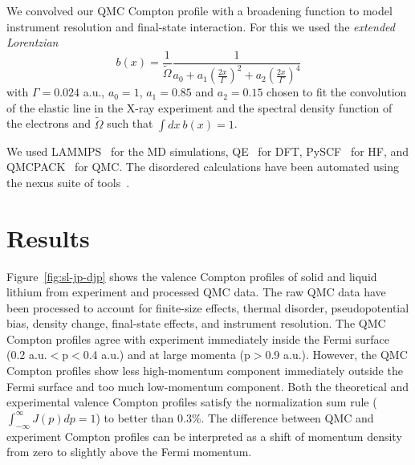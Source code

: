 \documentclass[aps,prb,showpacs,preprintnumbers,amsmath,amssymb,superscriptaddress,twocolumn]{revtex4-1}
\begin{document}
We convolved our QMC Compton profile with a broadening function to model instrument resolution and final-state interaction. For this we used the \emph{extended Lorentzian}
\begin{equation}
b(x) = \frac{1}{\tilde{\Omega}} \frac{1}{
a_0+a_1(\frac{2x}{\Gamma})^2+a_2(\frac{2x}{\Gamma})^4
}\label{eq:elorentz}
\end{equation}
with $\Gamma=0.024$ a.u., $a_0=1$, $a_1=0.85$ and $a_2=0.15$ chosen to fit the convolution of the elastic line in the X-ray experiment and the spectral density function of the electrons and $\tilde{\Omega}$ such that $\int dx ~b(x)=1$. 

We used LAMMPS~\cite{Plimpton1995} for the MD simulations, QE~\cite{Giannozzi2009,Giannozzi2017} for DFT, PySCF~\cite{PYSCF} for HF, and QMCPACK~\cite{Kim2018} for QMC. The disordered calculations have been automated using the nexus suite of tools~\cite{Krogel2016}.

\section{Results} \label{sec:results}

Figure~\ref{fig:sl-jp-djp} shows the valence Compton profiles of solid and liquid lithium from experiment and processed QMC data. The raw QMC data have been processed to account for finite-size effects, thermal disorder, pseudopotential bias, density change, final-state effects, and instrument resolution. The QMC Compton profiles agree with experiment immediately inside the Fermi surface (0.2 a.u.$<$p$<$0.4 a.u.) and at large momenta (p$>$0.9  a.u.). However, the QMC Compton profiles show less high-momentum component immediately outside the Fermi surface and too much low-momentum component. Both the theoretical and experimental valence Compton profiles satisfy the normalization sum rule ($\int_{-\infty}^{\infty} J(p)dp=1$) to better than 0.3\%. The difference between QMC and experiment Compton profiles can be interpreted as a shift of momentum density from zero to slightly above the Fermi momentum. 
\end{document}

